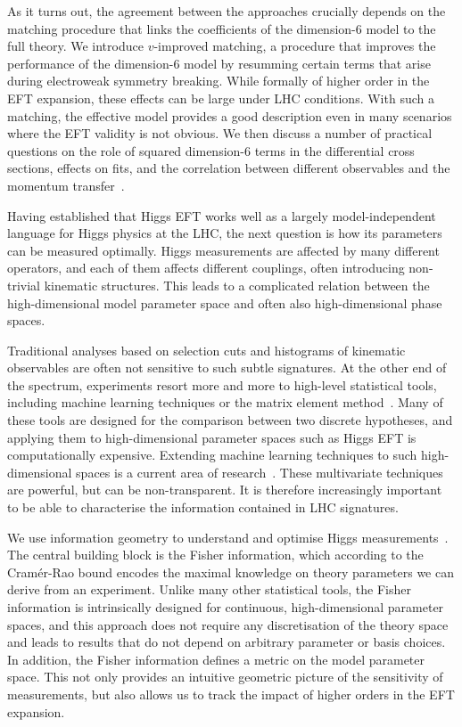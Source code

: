 As it turns out, the agreement between the approaches crucially
depends on the matching procedure that links the coefficients of the
dimension-6 model to the full theory. We introduce $v$-improved
matching, a procedure that improves the performance of the dimension-6
model by resumming certain terms that arise during electroweak
symmetry breaking. While formally of higher order in the EFT
expansion, these effects can be large under LHC conditions. With such
a matching, the effective model provides a good description even in
many scenarios where the EFT validity is not obvious. We then discuss
a number of practical questions on the role of squared dimension-6
terms in the differential cross sections, effects on fits, and the
correlation between different observables and the momentum
transfer~\cite{Biekotter:2016ecg}.

\newparagraph
%
Having established that Higgs EFT works well as a largely
model-independent language for Higgs physics at the LHC, the
next question is how its parameters can be measured optimally. Higgs
measurements are affected by many different operators, and each of
them affects different couplings, often introducing non-trivial
kinematic structures. This leads to a complicated relation between the
high-dimensional model parameter space and often also high-dimensional
phase spaces.

Traditional analyses based on selection cuts and histograms of
kinematic observables are often not sensitive to such subtle signatures.
At the other end of the spectrum, experiments resort more and more to
high-level statistical tools, including machine learning techniques or
the matrix element method~\cite{Kondo:1988yd, Atwood:1991ka,
  Gao:2010qx, Bolognesi:2012mm, Cranmer:2015nia}. Many of these tools
are designed for the comparison between two discrete hypotheses, and
applying them to high-dimensional parameter spaces such as Higgs EFT
is computationally expensive. Extending machine learning techniques to
such high-dimensional spaces is a current area of
research~\cite{Cranmer:2015bka}. These multivariate techniques are
powerful, but can be non-transparent. It is therefore increasingly
important to be able to characterise the information contained in LHC
signatures.

We use information geometry to understand and optimise Higgs
measurements~\cite{Brehmer:2016nyr}.  The central building block is
the Fisher information, which according to the Cram\'er-Rao bound
encodes the maximal knowledge on theory parameters we can derive from
an experiment. Unlike many other statistical tools, the Fisher
information is intrinsically designed for continuous, high-dimensional
parameter spaces, and this approach does not require any
discretisation of the theory space and leads to results that do not
depend on arbitrary parameter or basis choices. In addition, the
Fisher information defines a metric on the model parameter space. This
not only provides an intuitive geometric picture of the sensitivity of
measurements, but also allows us to track the impact of higher
orders in the EFT expansion.

